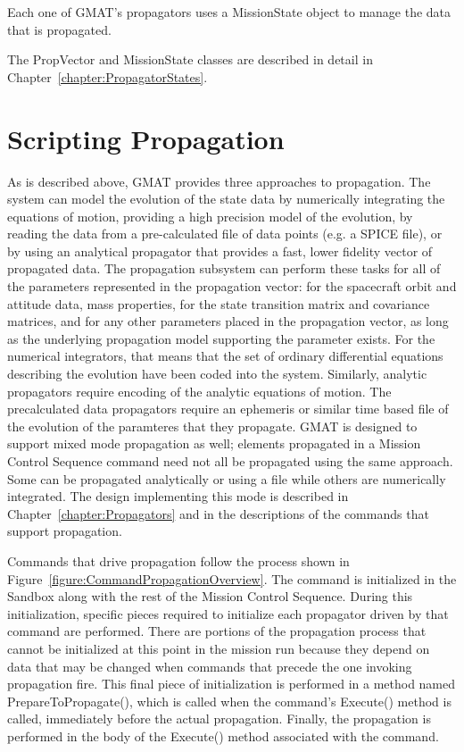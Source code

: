 \noindent Each one of GMAT's propagators uses a MissionState object to manage the data that is
propagated.

The PropVector and MissionState classes are described in detail in
Chapter~\ref{chapter:PropagatorStates}.

\section{Scripting Propagation}

As is described above, GMAT provides three approaches to propagation.  The system can model the
evolution of the state data by numerically integrating the equations of motion, providing a high
precision model of the evolution, by reading the data from a pre-calculated file of data points
(e.g. a SPICE file), or by using an analytical propagator that provides a fast, lower fidelity
vector of propagated data.  The propagation subsystem can perform these tasks for all of the
parameters represented in the propagation vector: for the spacecraft orbit and attitude data, mass
properties, for the state transition matrix and covariance matrices, and for any other parameters
placed in the propagation vector, as long as the underlying propagation model supporting the
parameter exists.  For the numerical integrators, that means that the  set of ordinary differential
equations describing the evolution have been coded into the system.  Similarly, analytic
propagators require encoding of the analytic equations of motion.  The precalculated data
propagators require an ephemeris or similar time based file of the evolution of the paramteres that
they propagate.  GMAT is designed to support mixed mode propagation as well; elements propagated in
a Mission Control Sequence command need not all be propagated using the same approach.  Some can be
propagated analytically or using a file while others are numerically integrated.  The design
implementing this mode is described in Chapter~\ref{chapter:Propagators} and in the descriptions of
the commands that support propagation.

Commands that drive propagation follow the process shown in
Figure~\ref{figure:CommandPropagationOverview}.  The command is initialized in the Sandbox along
with the rest of the Mission Control Sequence.  During this initialization, specific pieces
required to initialize each propagator driven by that command are performed.  There are portions of
the propagation process that cannot be initialized at this point in the mission run because they
depend on data that may be changed when commands that precede the one invoking propagation fire.
This final piece of initialization is performed in a method named PrepareToPropagate(), which is
called when the command's Execute() method is called, immediately before the actual propagation.
Finally, the propagation is performed in the body of the Execute() method associated with the
command.

